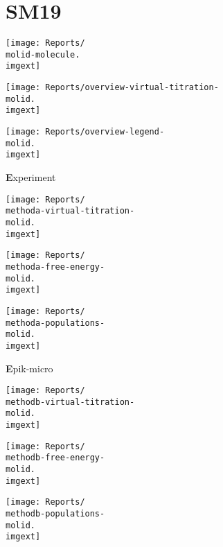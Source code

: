 \documentclass[9pt]{standalone}
\begin{document}
\newcommand{\molid}{SM19}
\newcommand{\imgext}{pdf}
\newcommand{\methoda}{Experiment}
\newcommand{\methodb}{Epik-micro}
\newcommand{\methodc}{Epik-macro}
\newcommand{\methodd}{Epik-scan}
\newcommand{\methode}{Jaguar-micro}
\newcommand{\methodf}{Jaguar-macro}
\section{\molid}
\noindent 
\begin{minipage}[s]{0.35\textwidth}\centering
\texttt{[image: Reports/\\molid-molecule.\\imgext]}
\end{minipage}
\begin{minipage}[s]{0.35\textwidth}
\texttt{[image: Reports/overview-virtual-titration-\\molid.\\imgext]}
\end{minipage}
\begin{minipage}[s]{0.23\textwidth}
\texttt{[image: Reports/overview-legend-\\molid.\\imgext]}
\end{minipage}

\begin{minipage}[s]{\textwidth}\centering
{\textbf \methoda}
\end{minipage}

\noindent
\begin{minipage}[s]{0.33\textwidth}\centering
\texttt{[image: Reports/\\methoda-virtual-titration-\\molid.\\imgext]}
\end{minipage}
\begin{minipage}[s]{0.33\textwidth}
\texttt{[image: Reports/\\methoda-free-energy-\\molid.\\imgext]}
\end{minipage}
\begin{minipage}[s]{0.33\textwidth}
\texttt{[image: Reports/\\methoda-populations-\\molid.\\imgext]}
\end{minipage}

\begin{minipage}[s]{\textwidth}\centering
{\textbf \methodb}
\end{minipage}

\noindent
\begin{minipage}[s]{0.33\textwidth}\centering
\texttt{[image: Reports/\\methodb-virtual-titration-\\molid.\\imgext]}
\end{minipage}
\begin{minipage}[s]{0.33\textwidth}
\texttt{[image: Reports/\\methodb-free-energy-\\molid.\\imgext]}
\end{minipage}
\begin{minipage}[s]{0.33\textwidth}
\texttt{[image: Reports/\\methodb-populations-\\molid.\\imgext]}
\end{minipage}
\end{document}
